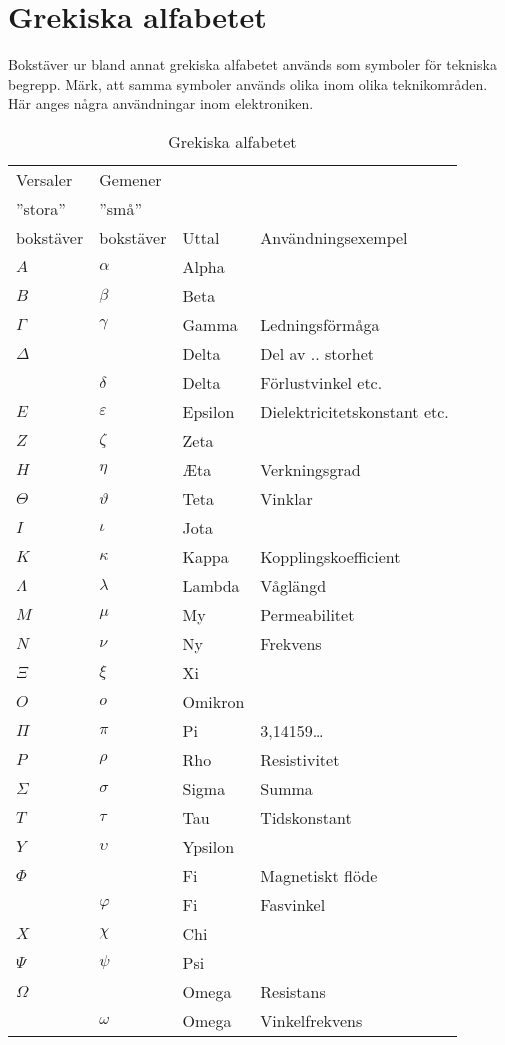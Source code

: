 \section{Grekiska alfabetet}

\begin{table}
  \caption{Grekiska alfabetet}

  Bokstäver ur bland annat grekiska alfabetet används som symboler för
  tekniska begrepp.
  Märk, att samma symboler används olika inom olika teknikområden.
  Här anges några användningar inom elektroniken.

  \begin{tabular}{ll|l|l}
    Versaler  & Gemener   &       & \\
    ''stora'' & ''små''   &       & \\
    bokstäver & bokstäver & Uttal & Användningsexempel \\
    \hline
    \(A\) & \(\alpha\) & Alpha & \\
    \(B\) & \(\beta\) & Beta & \\
    \(\Gamma\) & \(\gamma\) & Gamma & Ledningsförmåga \\
    \(\Delta\) & & Delta & Del av .. storhet \\
    & \(\delta\) & Delta & Förlustvinkel etc. \\
    \(E\) & \(\varepsilon\) & Epsilon & Dielektricitetskonstant etc.\\
    \(Z\) & \(\zeta\) & Zeta & \\
    \(H\) & \(\eta\) & \AE ta & Verkningsgrad\\
    \(\Theta\) & \(\vartheta\) & Teta & Vinklar \\
    \(I\) & \(\iota\) & Jota & \\
    \(K\) & \(\kappa\) & Kappa & Kopplingskoefficient \\
    \(\Lambda\) & \(\lambda\) & Lambda & Våglängd \\
    \(M\) & \(\mu\) & My & Permeabilitet \\
    \(N\) & \(\nu\) & Ny & Frekvens \\
    \(\Xi\) & \(\xi\) & Xi & \\
    \(O\) & \(o\) & Omikron & \\
    \(\Pi\) & \(\pi\) & Pi & 3,14159\dots \\
    \(P\) & \(\rho\) & Rho & Resistivitet \\
    \(\Sigma\) & \(\sigma\) & Sigma & Summa \\
    \(T\) & \(\tau\) & Tau & Tidskonstant \\
    \(Y\) & \(\upsilon\) & Ypsilon &  \\
    \(\Phi\) & & Fi & Magnetiskt flöde \\
    & \(\varphi\) & Fi & Fasvinkel \\
    \(X\) & \(\chi\) & Chi & \\
    \(\Psi\) & \(\psi\) & Psi & \\
    \(\Omega\) & & Omega & Resistans \\
    & \(\omega\) & Omega & Vinkelfrekvens \\
  \end{tabular}
\end{table}

